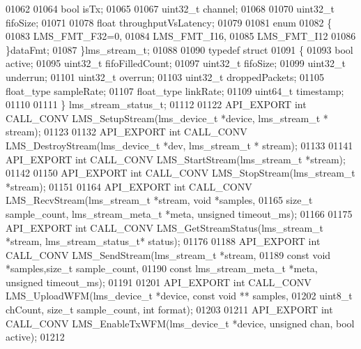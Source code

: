 \begin{DoxyCode}
01062 
01064     \textcolor{keywordtype}{bool} isTx;
01065 
01067     uint32\_t channel;
01068 
01070     uint32\_t fifoSize;
01071 
01078     \textcolor{keywordtype}{float} throughputVsLatency;
01079 
01081     \textcolor{keyword}{enum}
01082     \{
01083         LMS\_FMT\_F32=0,    
01084         LMS_FMT_I16,      
01085         LMS\_FMT\_I12       
01086     \}dataFmt;
01087 \}lms_stream_t;
01088 
01090 \textcolor{keyword}{typedef} \textcolor{keyword}{struct}
01091 \{
01093     \textcolor{keywordtype}{bool} active;
01095     uint32\_t fifoFilledCount;
01097     uint32\_t fifoSize;
01099     uint32\_t underrun;
01101     uint32\_t overrun;
01103     uint32\_t droppedPackets;
01105     float\_type sampleRate;
01107     float\_type linkRate;
01109     uint64\_t timestamp;
01110 
01111 \} lms_stream_status_t;
01112 
01122 API_EXPORT \textcolor{keywordtype}{int} CALL_CONV LMS_SetupStream(lms\_device\_t *device, lms_stream_t *
      stream);
01123 
01132 API_EXPORT \textcolor{keywordtype}{int} CALL_CONV LMS_DestroyStream(lms\_device\_t *dev, lms_stream_t *
      stream);
01133 
01141 API_EXPORT \textcolor{keywordtype}{int} CALL_CONV LMS_StartStream(lms_stream_t *stream);
01142 
01150 API_EXPORT \textcolor{keywordtype}{int} CALL_CONV LMS_StopStream(lms_stream_t *stream);
01151 
01164  API_EXPORT \textcolor{keywordtype}{int} CALL_CONV LMS_RecvStream(lms_stream_t *stream, \textcolor{keywordtype}{void} *samples,
01165              \textcolor{keywordtype}{size\_t} sample_count, lms_stream_meta_t *meta, \textcolor{keywordtype}{unsigned} timeout_ms);
01166 
01175 API_EXPORT \textcolor{keywordtype}{int} CALL_CONV LMS_GetStreamStatus(lms_stream_t *stream, 
      lms_stream_status_t* status);
01176 
01188 API_EXPORT \textcolor{keywordtype}{int} CALL_CONV LMS_SendStream(lms_stream_t *stream,
01189                             \textcolor{keyword}{const} \textcolor{keywordtype}{void} *samples,\textcolor{keywordtype}{size\_t} sample_count,
01190                             \textcolor{keyword}{const} lms_stream_meta_t *meta, \textcolor{keywordtype}{unsigned} timeout_ms);
01191 
01201 API_EXPORT \textcolor{keywordtype}{int} CALL_CONV LMS_UploadWFM(lms\_device\_t *device, \textcolor{keyword}{const} \textcolor{keywordtype}{void} **
      samples,
01202                                 uint8\_t chCount, \textcolor{keywordtype}{size\_t} sample_count, \textcolor{keywordtype}{int} format);
01203 
01211 API_EXPORT \textcolor{keywordtype}{int} CALL_CONV LMS_EnableTxWFM(lms\_device\_t *device, \textcolor{keywordtype}{unsigned} chan, \textcolor{keywordtype}{bool} 
      active);
01212 

\end{DoxyCode}
